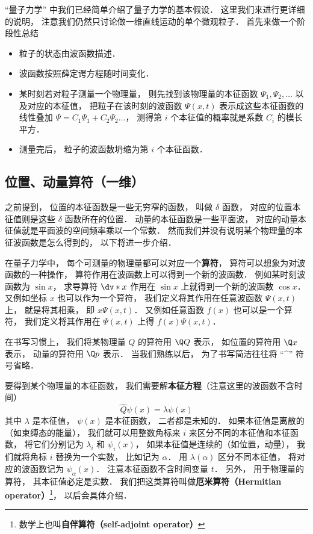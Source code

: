 


“量子力学” 中我们已经简单介绍了量子力学的基本假设． 这里我们来进行更详细的说明， 注意我们仍然只讨论做一维直线运动的单个微观粒子． 首先来做一个阶段性总结
\begin{itemize}
\item 粒子的状态由波函数描述．
\item 波函数按照薛定谔方程随时间变化．
\item 某时刻若对粒子测量一个物理量， 则先找到该物理量的本征函数 $\Psi_1, \Psi_2, \dots$ 以及对应的本征值， 把粒子在该时刻的波函数 $\Psi(x, t)$ 表示成这些本征函数的线性叠加 $\Psi = C_1 \Psi_1 + C_2 \Psi_2\dots$， 测得第 $i$ 个本征值的概率就是系数 $C_i$ 的模长平方．
\item 测量完后， 粒子的波函数坍缩为第 $i$ 个本征函数．
\end{itemize}

\subsection{位置、动量算符（一维）}
之前提到， 位置的本征函数是一些无穷窄的函数， 叫做 $\delta$ 函数， 对应的位置本征值则是这些 $\delta$ 函数所在的位置． 动量的本征函数是一些平面波， 对应的动量本征值就是平面波的空间频率乘以一个常数． 然而我们并没有说明某个物理量的本征波函数是怎么得到的， 以下将进一步介绍．

在量子力学中， 每个可测量的物理量都可以对应一个\textbf{算符}， 算符可以想象为对波函数的一种操作， 算符作用在波函数上可以得到一个新的波函数． 例如某时刻波函数为 $\sin x$， 求导算符 $\dv*{x}$ 作用在 $\sin x$ 上就得到一个新的波函数 $\cos x$． 又例如坐标 $x$ 也可以作为一个算符， 我们定义将其作用在任意波函数 $\Psi(x, t)$ 上， 就是将其相乘， 即 $x\Psi(x, t)$． 又例如任意函数 $f(x)$ 也可以是一个算符， 我们定义将其作用在 $\Psi(x, t)$ 上得 $f(x)\Psi(x, t)$．

在书写习惯上， 我们将某物理量 $Q$ 的算符用 $\Q Q$ 表示， 如位置的算符用 $\Q x$ 表示， 动量的算符用 $\Q p$ 表示． 当我们熟练以后， 为了书写简洁往往将 “$\hat{\phantom{x}}$” 符号省略．

要得到某个物理量的本征函数， 我们需要解\textbf{本征方程}（注意这里的波函数不含时间）
\begin{equation}
\hat Q \psi(x) = \lambda \psi(x)
\end{equation}
其中 $\lambda$ 是本征值， $\psi(x)$ 是本征函数， 二者都是未知的． 如果本征值是离散的（如束缚态的能量）， 我们就可以用整数角标来 $i$ 来区分不同的本征值和本征函数， 将它们分别记为 $\lambda_i$ 和 $\psi_i(x)$， 如果本征值是连续的（如位置，动量）， 我们就将角标 $i$ 替换为一个实数， 比如记为 $\alpha$． 用 $\lambda(\alpha)$ 区分不同本征值， 将对应的波函数记为 $\psi_\alpha(x)$． 注意本征函数不含时间变量 $t$． 另外， 用于物理量的算符， 其本征值必定是实数． 我们把这类算符叫做\textbf{厄米算符（Hermitian operator）}\footnote{数学上也叫\textbf{自伴算符（self-adjoint operator）}}， 以后会具体介绍．

